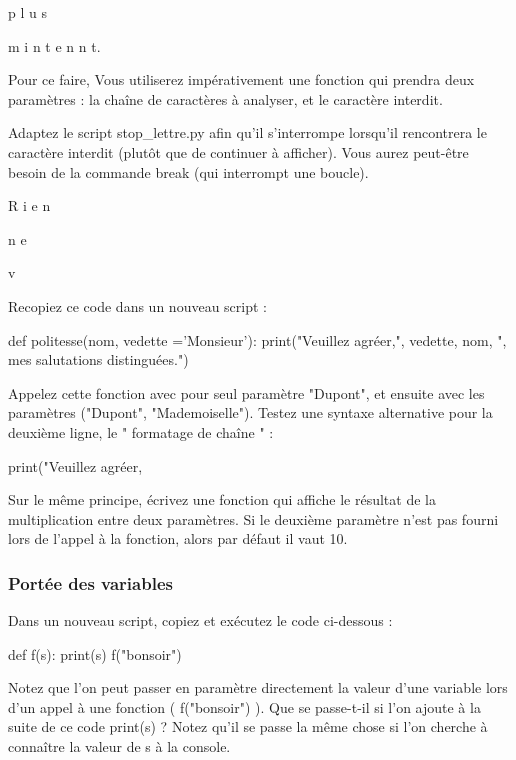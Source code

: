 p l u s

m i n t e n n t.
\vspace{0.1cm}

Pour ce faire, Vous utiliserez impérativement une fonction qui prendra deux paramètres : la chaîne de caractères à analyser, et le caractère interdit.


 Adaptez le script stop\_lettre.py afin qu'il s'interrompe lorsqu'il rencontrera le caractère interdit (plut\^ot que de continuer à afficher). Vous aurez peut-être besoin de la commande break (qui interrompt une boucle).

\vspace{0.1cm}
R i e n

n e

v

\vspace{0.1cm}

 Recopiez ce code dans un nouveau script :
\begin{python}
def politesse(nom, vedette ='Monsieur'):
  print("Veuillez agréer,", vedette, nom, ", mes salutations distinguées.")
\end{python}

Appelez cette fonction avec pour seul paramètre "Dupont", et ensuite avec les paramètres ("Dupont", "Mademoiselle").
Testez une syntaxe alternative pour la deuxième ligne, le " formatage de chaîne " :

\begin{python}
print("Veuillez agréer,%
\end{python}

Sur le même principe, écrivez une fonction qui affiche le résultat de la
multiplication entre deux paramètres. Si le deuxième paramètre n'est pas fourni
lors de l'appel à la fonction, alors par défaut il vaut 10.

\subsubsection*{Portée des variables}
 Dans un nouveau script, copiez et exécutez le code ci-dessous :

\begin{python}
def f(s):
  print(s)
f("bonsoir")
\end{python}

Notez que l'on peut passer en paramètre directement la valeur d'une variable lors d'un appel à une fonction ( f("bonsoir") ).
Que se passe-t-il si l'on ajoute à la suite de ce code print(s) ? Notez qu'il se passe la même chose si l'on cherche à connaître la valeur de s à la console.



